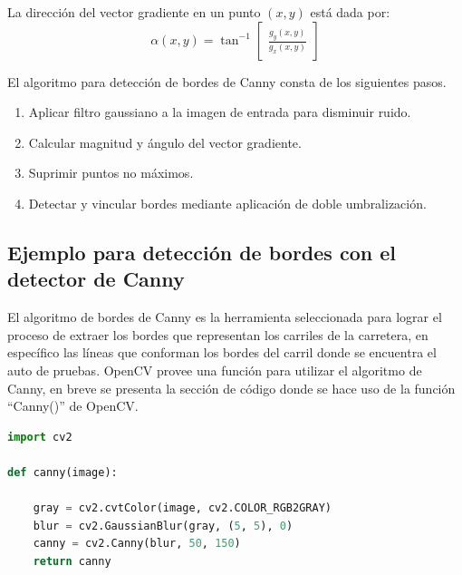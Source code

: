 La dirección del vector gradiente en un punto $(x, y)$ está dada por:
\begin{equation}
    \alpha (x, y) = \tan^{-1} \begin{bmatrix}
        \frac{g_y(x, y)}{g_x(x, y)}
    \end{bmatrix}
\end{equation}

El algoritmo para detección de bordes de Canny consta de los siguientes pasos.
\begin{enumerate}
    \item Aplicar filtro gaussiano a la imagen de entrada para disminuir ruido.
    \item Calcular magnitud y ángulo del vector gradiente.
    \item Suprimir puntos no máximos.
    \item Detectar y vincular bordes mediante aplicación de doble umbralización.
\end{enumerate}

\subsection{Ejemplo para detección de bordes con el detector de Canny} \label{sub:ejemplo_para_detección_de_bordes_con_el_detector_de_canny}

El algoritmo de bordes de Canny es la herramienta seleccionada para lograr el proceso de extraer los bordes que representan los carriles de la carretera, en específico las líneas que conforman los bordes del carril donde se encuentra el auto de pruebas. OpenCV provee una función para utilizar el algoritmo de Canny, en breve se presenta la sección de código donde se hace uso de la función ``Canny()'' de OpenCV.

\begin{lstlisting}[language=Python]
import cv2

def canny(image):

    gray = cv2.cvtColor(image, cv2.COLOR_RGB2GRAY)  
    blur = cv2.GaussianBlur(gray, (5, 5), 0)        
    canny = cv2.Canny(blur, 50, 150)                
    return canny
\end{lstlisting}

